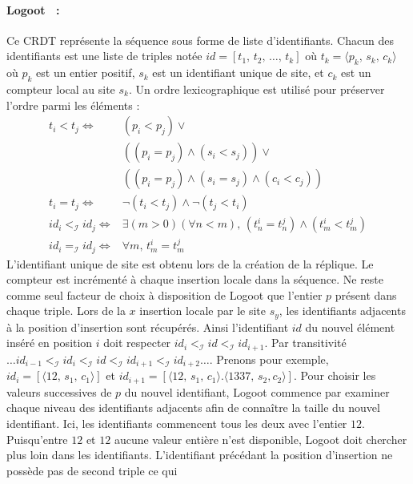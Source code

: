 \paragraph{Logoot~\cite{weiss2010collaborative, weiss2009logoot,
    weiss2010logootundo} :} Ce CRDT représente la séquence sous forme de liste
d'identifiants. Chacun des identifiants est une liste de triples notée
$id = [t_1,\,t_2,\,\ldots,\,t_k]$ où $t_k=\langle p_k,\,s_k,\,c_k \rangle$ où
$p_k$ est un entier positif, $s_k$ est un identifiant unique de site, et $c_k$
est un compteur local au site $s_k$. Un ordre lexicographique est utilisé pour
préserver l'ordre parmi les éléments :
\begin{align*}
  t_i < t_j \iff & (p_i < p_j) \vee \\
                 & ((p_i = p_j) \wedge (s_i<s_j)) \vee \\
                 & ((p_i = p_j) \wedge (s_i = s_j) \wedge (c_i < c_j)) \\
  t_i = t_j \iff & \neg (t_i < t_j) \wedge \neg (t_j < t_i) \\
  id_i <_\mathcal{I} id_j \iff & \exists (m > 0)(\forall n < m),\, (t^i_n = t^j_n) \wedge (t^i_m < t^j_m) \\
  id_i =_\mathcal{I} id_j \iff & \forall m,\, t^i_m = t^j_m
\end{align*}
L'identifiant unique de site est obtenu lors de la création de la réplique. Le
compteur est incrémenté à chaque insertion locale dans la séquence. Ne reste
comme seul facteur de choix à disposition de Logoot que l'entier $p$ présent
dans chaque triple. Lors de la $x$ insertion locale par le site $s_y$,
les identifiants adjacents à la position d'insertion sont récupérés. Ainsi
l'identifiant $id$ du nouvel élément inséré en position $i$ doit respecter
$id_{i}<_\mathcal{I} id <_\mathcal{I} id_{i+1}$. Par transitivité
$\ldots id_{i-1} <_\mathcal{I} id_{i} <_\mathcal{I} id <_\mathcal{I} id_{i+1}
<_\mathcal{I} id_{i+2} \ldots$.
Prenons pour exemple, $id_{i}=[\langle 12,\,s_1,\,c_1\rangle]$ et
$id_{i+1}=[\langle 12,\, s_1,\,c_1\rangle.\langle 1337,\, s_2, c_2\rangle]$.
Pour choisir les valeurs successives de $p$ du nouvel identifiant, Logoot
commence par examiner chaque niveau des identifiants adjacents afin de connaître
la taille du nouvel identifiant. Ici, les identifiants commencent tous les deux
avec l'entier $12$.  Puisqu'entre $12$ et $12$ aucune valeur entière n'est
disponible, Logoot doit chercher plus loin dans les identifiants. L'identifiant
précédant la position d'insertion ne possède pas de second triple ce qui
